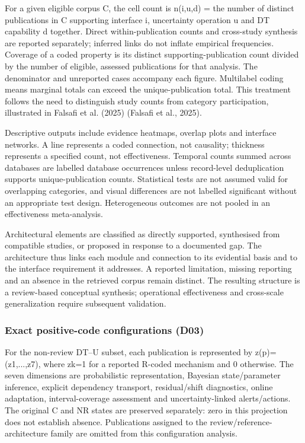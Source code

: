 For a given eligible corpus C, the cell count is n(i,u,d) = the number of distinct publications in C supporting interface i, uncertainty operation u and DT capability d together. Direct within-publication counts and cross-study synthesis are reported separately; inferred links do not inflate empirical frequencies. Coverage of a coded property is its distinct supporting-publication count divided by the number of eligible, assessed publications for that analysis. The denominator and unreported cases accompany each figure. Multilabel coding means marginal totals can exceed the unique-publication total. This treatment follows the need to distinguish study counts from category participation, illustrated in Falsafi et al. (2025) (Falsafi et al., 2025).

Descriptive outputs include evidence heatmaps, overlap plots and interface networks. A line represents a coded connection, not causality; thickness represents a specified count, not effectiveness. Temporal counts summed across databases are labelled database occurrences unless record-level deduplication supports unique-publication counts. Statistical tests are not assumed valid for overlapping categories, and visual differences are not labelled significant without an appropriate test design. Heterogeneous outcomes are not pooled in an effectiveness meta-analysis.

Architectural elements are classified as directly supported, synthesised from compatible studies, or proposed in response to a documented gap. The architecture thus links each module and connection to its evidential basis and to the interface requirement it addresses. A reported limitation, missing reporting and an absence in the retrieved corpus remain distinct. The resulting structure is a review-based conceptual synthesis; operational effectiveness and cross-scale generalization require subsequent validation.


\subsubsection{Exact positive-code configurations (D03)}
For the non-review DT–U subset, each publication is represented by z(p)=(z1,...,z7), where zk=1 for a reported R-coded mechanism and 0 otherwise. The seven dimensions are probabilistic representation, Bayesian state/parameter inference, explicit dependency transport, residual/shift diagnostics, online adaptation, interval-coverage assessment and uncertainty-linked alerts/actions. The original C and NR states are preserved separately: zero in this projection does not establish absence. Publications assigned to the review/reference-architecture family are omitted from this configuration analysis.

